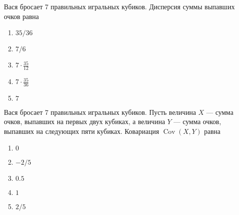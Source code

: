 \documentclass[t]{beamer}
\DeclareMathOperator{\Cov}{Cov}
\begin{document}
 \begin{frame} \label{10} 
\begin{block}{10} 

Вася бросает 7 правильных игральных кубиков. Дисперсия суммы выпавших очков равна
 


 \end{block} 
\begin{enumerate} 
\item[] \hyperlink{10-No}{\beamergotobutton{} $35/36$}
\item[] \hyperlink{10-No}{\beamergotobutton{} $7/6$}
\item[] \hyperlink{10-Yes}{\beamergotobutton{} $7\cdot\frac{35}{12}$}
\item[] \hyperlink{10-No}{\beamergotobutton{} $7\cdot \frac{35}{36}$}
\item[] \hyperlink{10-No}{\beamergotobutton{} $7$}
\end{enumerate} 
\end{frame} 


 \begin{frame} \label{11} 
\begin{block}{11} 

Вася бросает 7 правильных игральных кубиков. Пусть величина  $X$ — сумма очков, выпавших на первых двух кубиках, а величина  $Y$ — сумма очков, выпавших на следующих пяти кубиках. Ковариация $\Cov(X,Y)$ равна
 


 \end{block} 
\begin{enumerate} 
\item[] \hyperlink{11-Yes}{\beamergotobutton{} $0$}
\item[] \hyperlink{11-No}{\beamergotobutton{} $-2/5$
}
\item[] \hyperlink{11-No}{\beamergotobutton{} $0.5$}
\item[] \hyperlink{11-No}{\beamergotobutton{} $1$}
\item[] \hyperlink{11-No}{\beamergotobutton{} $2/5$}
\end{enumerate} 
\end{frame} 
\end{document}
